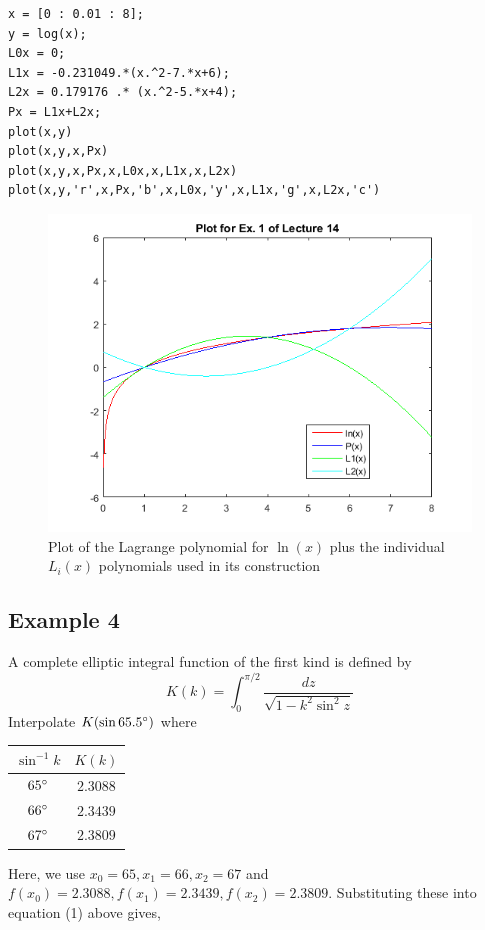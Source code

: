 \documentclass [titlepage,12pt,letter] {article}
\begin{document}
\begin{verbatim}
x = [0 : 0.01 : 8];
y = log(x);
L0x = 0;
L1x = -0.231049.*(x.^2-7.*x+6);
L2x = 0.179176 .* (x.^2-5.*x+4);
Px = L1x+L2x;
plot(x,y)
plot(x,y,x,Px)
plot(x,y,x,Px,x,L0x,x,L1x,x,L2x)
plot(x,y,'r',x,Px,'b',x,L0x,'y',x,L1x,'g',x,L2x,'c')
\end{verbatim}

\begin{figure} 
  \centering
  \includegraphics[scale=0.75]{lagrange_example}
  \caption{Plot of the Lagrange polynomial for $\ln(x)$ plus the individual $L_i(x)$ polynomials used in its construction}
  \label{fig:lagrange}
\end{figure}

\subsection{Example 4} 
A complete elliptic integral function of the first kind is defined by
\[
K(k) = \int_{0}^{\pi/2} \frac{dz}{\sqrt{1 - k^2\sin^2{z}}}
\]
Interpolate $K(\sin{65.5 \degree})$ where
\begin{center}
\begin{tabular}{c|c} 
$\sin^{-1}{k}$ & $K(k)$ \\
 \hline
 $65\degree$ & $2.3088$ \\ 
 $66\degree$ & $2.3439$ \\ 
 $67\degree$ & $2.3809$ \\ 
\end{tabular}
\end{center}

Here, we use $x_0 = 65, x_1=66, x_2=67$ and $f(x_0)=2.3088, f(x_1)=2.3439, f(x_2)=2.3809$. Substituting these into equation (1) above gives,
\end{document}
